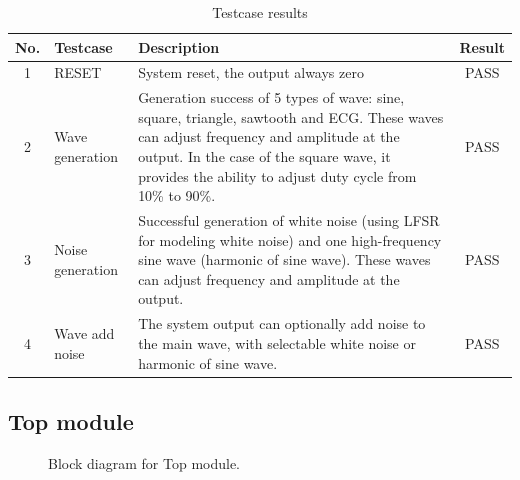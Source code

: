 \begin{table}[H]
	\centering
	\begin{tabular}{|c|m{3cm}|m{10cm}|c|}
		\hline
		\textbf{No.} & \textbf{Testcase} & \textbf{Description} & \textbf{Result} \\
		\hline
		1 & RESET & System reset, the output always zero & PASS \\
		\hline
		2 & Wave generation & Generation success of 5 types of wave: sine, square, triangle, sawtooth and ECG. 
		These waves can adjust frequency and amplitude at the output. 
		In the case of the square wave, it provides the ability to adjust duty cycle from 10\% to 90\%. & PASS \\
		\hline
		3 & Noise generation & Successful generation of white noise (using LFSR for modeling white noise) and one high-frequency sine wave (harmonic of sine wave). 
		These waves can adjust frequency and amplitude at the output. & PASS \\
		\hline
		4 & Wave add noise & The system output can optionally add noise to the main wave, with selectable white noise or harmonic of sine wave. & PASS \\
		\hline
	\end{tabular}
	\caption{Testcase results}
\end{table}

\subsection{Top module}

\begin{figure}[H]
	\centering
	\caption{Block diagram for Top module.}
\end{figure}

